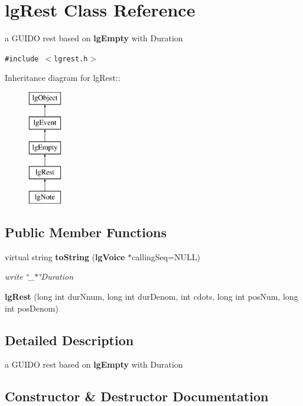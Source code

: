 \section{lg\-Rest Class Reference}
\label{classlgRest}
a GUIDO rest based on {\bf lg\-Empty} with Duration  


{\tt \#include $<$lgrest.h$>$}

Inheritance diagram for lg\-Rest::\begin{figure}[H]
\begin{center}
\leavevmode
\includegraphics[height=5cm]{classlgRest}
\end{center}
\end{figure}
\subsection*{Public Member Functions}
\begin{CompactItemize}
\item 
virtual string {\bf to\-String} ({\bf lg\-Voice} $\ast$calling\-Seq=NULL)
\begin{CompactList}\small\item\em write \char`\"{}\_\-$\ast$\char`\"{}Duration \item\end{CompactList}\item 
{\bf lg\-Rest} (long int dur\-Nnum, long int dur\-Denom, int cdots, long int pos\-Num, long int pos\-Denom)
\end{CompactItemize}


\subsection{Detailed Description}
a GUIDO rest based on {\bf lg\-Empty} with Duration 



\subsection{Constructor \& Destructor Documentation}
